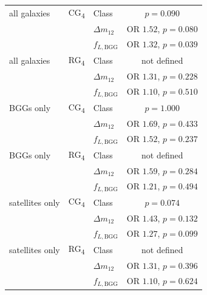\documentclass{aa}
\newcommand{\CG}{CG\textsubscript{4}}
\newcommand{\RG}{RG\textsubscript{4}}
\begin{document}
\begin{appendix}
\begin{table}
\begin{tabular}{lllc}
all galaxies & \CG{} & Class & \(p = 0.090\) \\
 & & \(\Delta m_{12}\) & OR \(1.52\), \(p = 0.080\) \\
 & & \(f_{L,\mathrm{BGG}}\) & OR \(1.32\), \(p = 0.039\) \\







all galaxies & \RG{} & Class & not defined \\
 & & \(\Delta m_{12}\) & OR \(1.31\), \(p = 0.228\) \\
 & & \(f_{L,\mathrm{BGG}}\) & OR \(1.10\), \(p = 0.510\) \\









BGGs only & \CG{} & Class & \(p = 1.000\) \\
 & & \(\Delta m_{12}\) & OR \(1.69\), \(p = 0.433\) \\
 & & \(f_{L,\mathrm{BGG}}\) & OR \(1.52\), \(p = 0.237\) \\







BGGs only & \RG{} & Class & not defined \\
 & & \(\Delta m_{12}\) & OR \(1.59\), \(p = 0.284\) \\
 & & \(f_{L,\mathrm{BGG}}\) & OR \(1.21\), \(p = 0.494\) \\









satellites only & \CG{} & Class & \(p = 0.074\) \\
 & & \(\Delta m_{12}\) & OR \(1.43\), \(p = 0.132\) \\
 & & \(f_{L,\mathrm{BGG}}\) & OR \(1.27\), \(p = 0.099\) \\







satellites only & \RG{} & Class & not defined \\
 & & \(\Delta m_{12}\) & OR \(1.31\), \(p = 0.396\) \\
 & & \(f_{L,\mathrm{BGG}}\) & OR \(1.10\), \(p = 0.624\) \\



\end{tabular}
\end{table}
\end{appendix}
\end{document}
